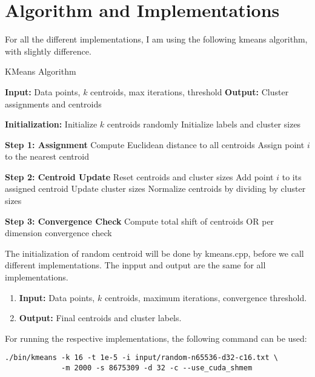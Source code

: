 \documentclass[letterpaper,12pt]{article}
\theoremstyle{remark}
\begin{document}
\section{Algorithm and Implementations}
For all the different implementations, I am using the following kmeans algorithm, with slightly difference.
\begin{algorithm} 
\caption{KMeans Algorithm}\label{kmeans}
\begin{algorithmic}[1]
\State \textbf{Input:} Data points, $k$ centroids, max iterations, threshold
\State \textbf{Output:} Cluster assignments and centroids

\State \textbf{Initialization:}
\State Initialize $k$ centroids randomly
\State Initialize labels and cluster sizes

    \State \textbf{Step 1: Assignment}
        \State Compute Euclidean distance to all centroids
        \State Assign point $i$ to the nearest centroid
    \EndFor

    \State \textbf{Step 2: Centroid Update}
    \State Reset centroids and cluster sizes
        \State Add point $i$ to its assigned centroid
        \State Update cluster sizes
    \EndFor
    \State Normalize centroids by dividing by cluster sizes

    \State \textbf{Step 3: Convergence Check}
    \State Compute total shift of centroids OR per dimension convergence check
    
\EndFor
\end{algorithmic}
\end{algorithm}
\clearpage


The initialization of random centroid will be done by kmeans.cpp, before we call different implementations. The inpput and output are the same for all implementations.


\begin{enumerate}
    \item \textbf{Input:} Data points, $k$ centroids, maximum iterations, convergence threshold.
    \item \textbf{Output:} Final centroids and cluster labels.
\end{enumerate}

For running the respective implementations, the following command can be used:

\begin{verbatim}
./bin/kmeans -k 16 -t 1e-5 -i input/random-n65536-d32-c16.txt \
             -m 2000 -s 8675309 -d 32 -c --use_cuda_shmem
\end{verbatim}
\end{document}
